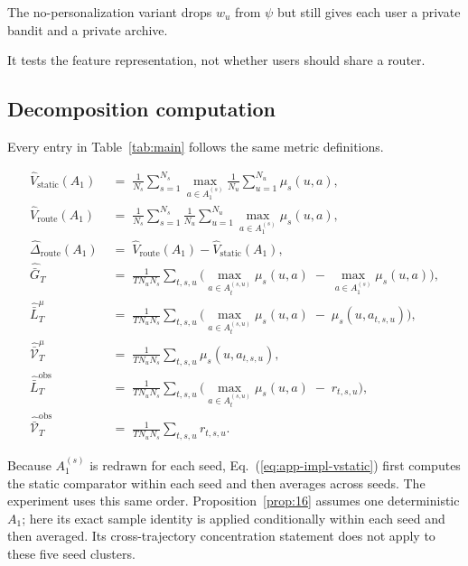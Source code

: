 \documentclass{article} %
\renewcommand{\eqref}[1]{\textup{(\ref{#1})}}
\begin{document}
The no-personalization variant drops $w_u$ from $\psi$ but still gives each user a private bandit and a private archive.

It tests the feature representation, not whether users should share a router.

\subsection{Decomposition computation}

\label{app:impl-decomp}

Every entry in Table~\ref{tab:main} follows the same metric definitions.

\begin{align}
\label{eq:app-impl-vstatic}
\widehat V_{\mathrm{static}}(A_1) &\;=\; \frac{1}{N_s}\sum_{s=1}^{N_s}
\max_{a \in A_1^{(s)}}\frac{1}{N_u}\sum_{u=1}^{N_u}\mu_s(u,a),\\
\label{eq:app-impl-vroute}
\widehat V_{\mathrm{route}}(A_1) &\;=\; \frac{1}{N_s}\sum_{s=1}^{N_s}
\frac{1}{N_u}\sum_{u=1}^{N_u}\max_{a \in A_1^{(s)}}\mu_s(u,a),\\
\label{eq:app-impl-dhet}
\widehat\Delta_{\mathrm{route}}(A_1) &\;=\; \widehat V_{\mathrm{route}}(A_1) - \widehat V_{\mathrm{static}}(A_1),\\
\label{eq:app-impl-Gt}
\widehat{\bar G}_T &\;=\; \frac{1}{T N_u N_s}\sum_{t,s,u}\!\Big(\max_{a \in A_t^{(s,u)}}\mu_s(u, a) \;-\; \max_{a \in A_1^{(s)}}\mu_s(u, a)\Big),\\
\label{eq:app-impl-Lt-mean}
\widehat{\bar L}_T^\mu &\;=\; \frac{1}{T N_u N_s}\sum_{t,s,u}\!\Big(\max_{a \in A_t^{(s,u)}}\mu_s(u, a) \;-\; \mu_s(u,a_{t,s,u})\Big),\\
\label{eq:app-impl-V-mean}
\widehat{\bar{\mathcal V}}_T^\mu &\;=\; \frac{1}{T N_u N_s}\sum_{t,s,u}\mu_s(u,a_{t,s,u}),\\
\label{eq:app-impl-Lt}
\widehat{\bar L}_T^{\mathrm{obs}} &\;=\; \frac{1}{T N_u N_s}\sum_{t,s,u}\!\Big(\max_{a \in A_t^{(s,u)}}\mu_s(u, a) \;-\; r_{t,s,u}\Big),\\
\label{eq:app-impl-V}
\widehat{\bar{\mathcal V}}_T^{\mathrm{obs}} &\;=\; \frac{1}{T N_u N_s}\sum_{t,s,u} r_{t,s,u}.
\end{align}

Because \(A_1^{(s)}\) is redrawn for each seed, Eq.~\eqref{eq:app-impl-vstatic}
first computes the static comparator within each seed and then averages across
seeds. The experiment uses this same order. Proposition~\ref{prop:16}
assumes one deterministic \(A_1\); here its exact sample identity is applied
conditionally within each seed and then averaged. Its cross-trajectory
concentration statement does not apply to these five seed clusters.
\end{document}
